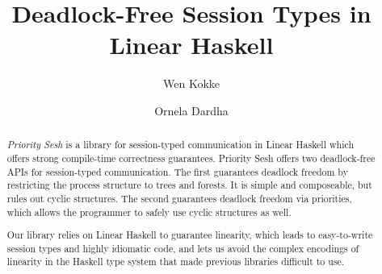 \documentclass[sigplan,screen]{acmart}
\begin{document}
\title{Deadlock-Free Session Types in Linear Haskell}

\author{Wen Kokke}

\author{Ornela Dardha}

\begin{abstract}
  \emph{Priority Sesh} is a library for session-typed communication in Linear Haskell which offers strong compile-time correctness guarantees. Priority Sesh offers two deadlock-free APIs for session-typed communication. The first guarantees deadlock freedom by restricting the process structure to trees and forests. It is simple and composeable, but rules out cyclic structures. The second guarantees deadlock freedom via priorities, which allows the programmer to safely use cyclic structures as well.

  Our library relies on Linear Haskell to guarantee linearity, which leads to easy-to-write session types and highly idiomatic code, and lets us avoid the complex encodings of linearity in the Haskell type system that made previous libraries difficult to use.
\end{abstract}
\end{document}
